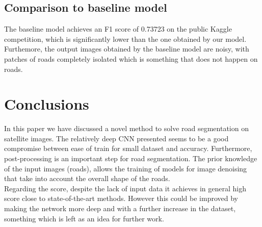 \documentclass[10pt,conference,compsocconf]{IEEEtran}
\begin{document}
\subsection{Comparison to baseline model}
The baseline model achieves an F1 score of 0.73723 on the public Kaggle competition, which is significantly lower than the one obtained by our model. Furthemore, the output images obtained by the baseline model are noisy, with patches of roads completely isolated which is something that does not happen on roads.


\section{Conclusions}
\label{sec:conclusions}
In this paper we have discussed a novel method to solve road segmentation on satellite images. The relatively deep CNN presented seems to be a good compromise between ease of train for small dataset and accuracy. Furthermore, post-processing is an important step for road segmentation. The prior knowledge of the input images (roads), allows the training of models for image denoising that take into account the overall shape of the roads.\\
Regarding the score, despite the lack of input data it achieves in general high score close to state-of-the-art methods. However this could be improved by making the network more deep and with a further increase in the dataset, something which is left as an idea for further work.






\end{document}
